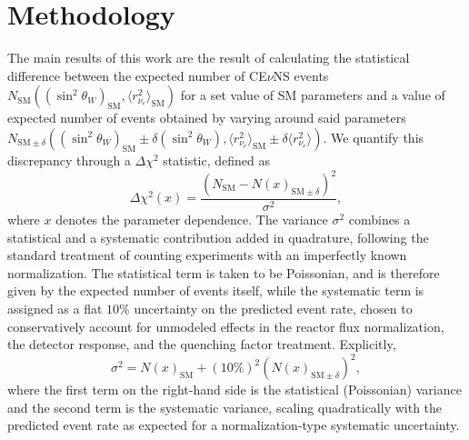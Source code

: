 \section{Methodology}\label{sec:method}
The main results of this work are the result of calculating the statistical difference between the expected number of CE$\nu$NS events $N_{\text{SM}}\left(\left(\sin^2\theta_W\right)_{\text{SM}}, \langle r_{\nu_e}^2\rangle_{\text{SM}} \right)$ for a set value of SM parameters and a value of expected number of events obtained by varying around said parameters $N_{\text{SM}\pm\delta}\left(\left(\sin^2\theta_W\right)_{\text{SM}} \pm \delta\left(\sin^2\theta_W\right), \langle r_{\nu_e}^2\rangle_{\text{SM}} \pm \delta\langle r_{\nu_e}^2\rangle \right)$. We quantify this discrepancy through a $\Delta\chi^2$ statistic, defined as
\begin{equation}
\Delta\chi^2(x) = \frac{\left(N_{\text{SM}} - N(x)_{\text{SM}\pm\delta}\right)^2}{\sigma^2},
\label{eq:chi2}
\end{equation}
where $x$ denotes the parameter dependence. The variance $\sigma^2$ combines a statistical and a systematic contribution added in quadrature, following the standard treatment of counting experiments with an imperfectly known normalization. The statistical term is taken to be Poissonian, and is therefore given by the expected number of events itself, while the systematic term is assigned as a flat $10\%$ uncertainty on the predicted event rate, chosen to conservatively account for unmodeled effects in the reactor flux normalization, the detector response, and the quenching factor treatment. Explicitly,
\begin{equation}
\sigma^2 = N(x)_{\text{SM}} + \left(10\%\right)^2 \left(N(x)_{\text{SM}\pm\delta}\right)^2,
\label{eq:variance}
\end{equation}
where the first term on the right-hand side is the statistical (Poissonian) variance and the second term is the systematic variance, scaling quadratically with the predicted event rate as expected for a normalization-type systematic uncertainty.


